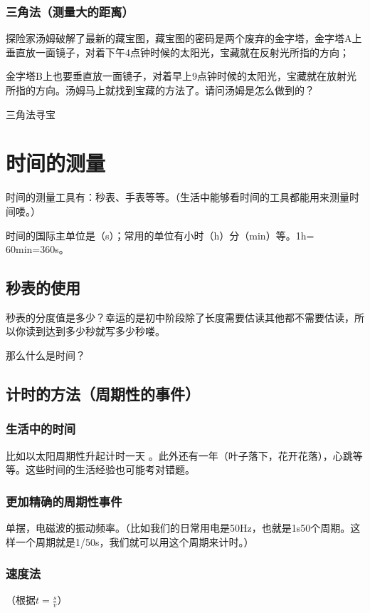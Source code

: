 \documentclass[12pt,twoside]{exam}
\begin{document}
\begin{knowledge}
\subsubsection{三角法（测量大的距离）}
探险家汤姆破解了最新的藏宝图，藏宝图的密码是两个废弃的金字塔，金字塔A上垂直放一面镜子，对着下午4点钟时候的太阳光，宝藏就在反射光所指的方向；

金字塔B上也要垂直放一面镜子，对着早上9点钟时候的太阳光，宝藏就在放射光所指的方向。汤姆马上就找到宝藏的方法了。请问汤姆是怎么做到的？

\begin{fig}[0.8]{三角法寻宝}
\end{fig}


\section{时间的测量}
时间的测量工具有：秒表、手表等等。（生活中能够看时间的工具都能用来测量时间喽。）

时间的国际主单位是\answerline*[秒]（s）；常用的单位有小时（h）分（min）等。1h= 60min=360s。


\subsection{秒表的使用}
秒表的分度值是多少？幸运的是初中阶段除了长度需要估读其他都不需要估读，所以你读到达到多少秒就写多少秒喽。

那么什么是时间？

\subsection{计时的方法（周期性的事件）}
\subsubsection{生活中的时间}
比如以太阳周期性升起计时一天  。此外还有一年（叶子落下，花开花落），心跳等等。这些时间的生活经验也可能考对错题。


\subsubsection{更加精确的周期性事件}
单摆，电磁波的振动频率。（比如我们的日常用电是50Hz，也就是1s50个周期。这样一个周期就是1/50s，我们就可以用这个周期来计时。）


\subsubsection{速度法}
（根据$t=\frac{s}{v}$）



\end{knowledge}
\end{document}
